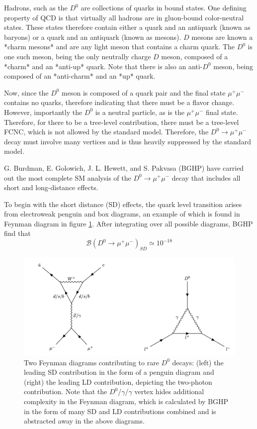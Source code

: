 Hadrons, such as the $D^0$ are collections of quarks in bound states. One defining property of QCD is that virtually all hadrons are in gluon-bound color-neutral states. These states therefore contain either a quark and an antiquark (known as baryons) or a quark and an antiquark (known as mesons). $D$ mesons are known a *charm mesons* and are any light meson that contains a charm quark. The $D^0$ is one such meson, being the only neutrally charge $D$ meson, composed of a *charm* and an *anti-up* quark. Note that there is also an anti-$D^0$ meson, being composed of an *anti-charm* and an *up* quark. 

Now, since the $D^0$ meson is composed of a quark pair and the final state $\mu^+ \mu^-$ contains no quarks, therefore indicating that there must be a flavor change. However, importantly the $D^0$ is a neutral particle, as is the $\mu^+ \mu^-$ final state. Therefore, for there to be a tree-level contribution, there must be a tree-level FCNC, which is not allowed by the standard model. Therefore, the $D^0 \to \mu^+ \mu^-$  decay must involve many vertices and is thus heavily suppressed by the standard model.

G. Burdman, E. Golowich, J. L. Hewett, and S. Pakvasa (BGHP) have carried out the most complete SM analysis of the $D^0 \to \mu^+ \mu^-$ decay that includes all short and long-distance effects. 

To begin with the short distance (SD) effects, the quark level transition arises from electroweak penguin and box diagrams, an example of which is found in Feynman diagram in figure \ref{fig:D0_decay_diagrams}. After integrating over all possible diagrams, BGHP find that 
\begin{equation}
\mathcal{B}(D^0 \to \mu^+ \mu^-)_{SD} \simeq 10^{-18}
\end{equation}

\begin{figure}[ht!]
    \centering
    \includegraphics[width=1.0\textwidth]{figures/chapter2/d0_FCNC_decays.png}
    \caption{Two Feynman diagrams contributing to rare \(D^0\) decays: (left) the leading SD contribution in the form of a penguin diagram and (right) the leading LD contribution, depicting the two-photon contribution. Note that the $D^0$/$\gamma$/$\gamma$ vertex hides additional complexity in the Feynman diagram, which is calculated by BGHP in the form of many SD and LD contributions combined and is abstracted away in the above diagrams.}
  \label{fig:D0_decay_diagrams}
\end{figure}

